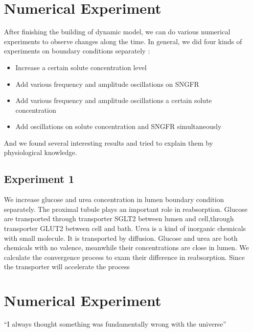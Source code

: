 \documentclass{article}
\begin{document}
\section{Numerical Experiment}
After finishing the building of dynamic model, we can do various numerical experiments to observe changes along the time. In general, we did four kinds of experiments on boundary conditions separately :
\begin{itemize}
	\item Increase a certain solute concentration level
	\item Add various frequency and amplitude oscillations on SNGFR 
	\item Add various frequency and amplitude oscillations a certain solute concentration
	\item Add oscillations on solute concentration and SNGFR simultaneously
\end{itemize}
And we found several interesting results and tried to explain them by physiological knowledge.

\subsection{Experiment 1}
We increase glucose and urea concentration in lumen boundary condition separately. The proximal tubule plays an important role in reabsorption. Glucose are transported through transporter SGLT2 between lumen and cell,through transporter GLUT2 between cell and bath. Urea is a kind of inorganic chemicals with small molecule. It is transported by diffusion. Glucose and urea are both chemicals with no valence, meanwhile their concentrations are close in lumen. We calculate the convergence process to exam their difference in reabsorption. Since the transporter will accelerate the process


\section{Numerical Experiment}
``I always thought something was fundamentally wrong with the universe'' \citep{adams1995hitchhiker}



\end{document}
